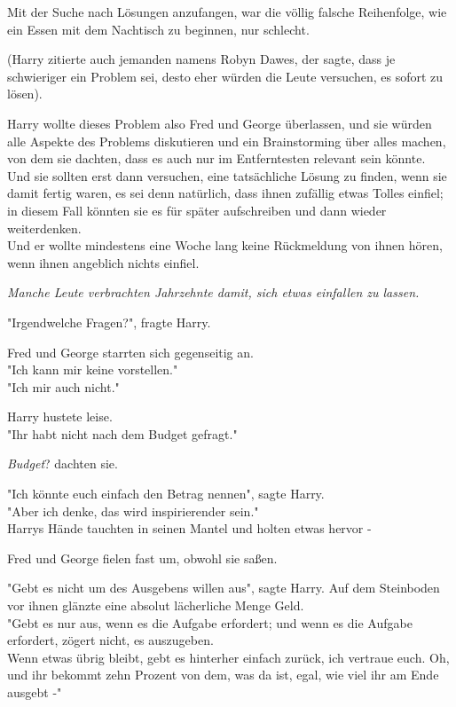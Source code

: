 {Mit der Suche nach Lösungen anzufangen, war die völlig falsche Reihenfolge, wie ein Essen mit dem Nachtisch zu beginnen, nur schlecht.

(Harry zitierte auch jemanden namens Robyn Dawes, der sagte, dass je schwieriger ein Problem sei, desto eher würden die Leute versuchen, es sofort zu lösen).

Harry wollte dieses Problem also Fred und George überlassen, und sie würden alle Aspekte des Problems diskutieren und ein Brainstorming über alles machen, von dem sie dachten, dass es auch nur im Entferntesten relevant sein könnte.\\ Und sie sollten erst dann versuchen, eine tatsächliche Lösung zu finden, wenn sie damit fertig waren, es sei denn natürlich, dass ihnen zufällig etwas Tolles einfiel; in diesem Fall könnten sie es für später aufschreiben und dann wieder weiterdenken.\\ Und er wollte mindestens eine Woche lang keine Rückmeldung von ihnen hören, wenn ihnen angeblich nichts einfiel.

\emph{Manche Leute verbrachten Jahrzehnte damit, sich etwas einfallen zu lassen.}

"Irgendwelche Fragen?", fragte Harry.

Fred und George starrten sich gegenseitig an.\\ "Ich kann mir keine vorstellen."\\ "Ich mir auch nicht."

Harry hustete leise.\\ "Ihr habt nicht nach dem Budget gefragt."

\emph{Budget}? dachten sie.

"Ich könnte euch einfach den Betrag nennen", sagte Harry.\\ "Aber ich denke, das wird inspirierender sein."\\ Harrys Hände tauchten in seinen Mantel und holten etwas hervor -

Fred und George fielen fast um, obwohl sie saßen.

"Gebt es nicht um des Ausgebens willen aus", sagte Harry. Auf dem Steinboden vor ihnen glänzte eine absolut lächerliche Menge Geld.\\ "Gebt es nur aus, wenn es die Aufgabe erfordert; und wenn es die Aufgabe erfordert, zögert nicht, es auszugeben.\\ Wenn etwas übrig bleibt, gebt es hinterher einfach zurück, ich vertraue euch. Oh, und ihr bekommt zehn Prozent von dem, was da ist, egal, wie viel ihr am Ende ausgebt -"

}

